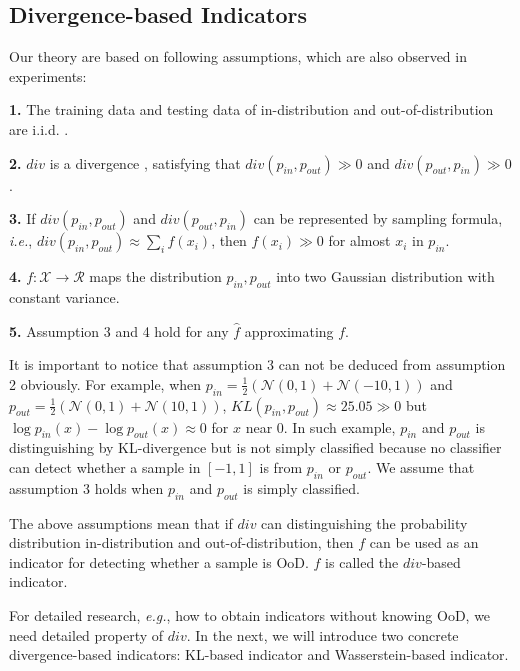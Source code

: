 \documentclass[letterpaper]{article} %
\newcommand{\IE}{\textit{i.e.}, }
\newcommand{\EG}{\textit{e.g.}, }
\newcommand{\pin}{p_{in}}
\newcommand{\pout}{p_{out}}
\begin{document}
\subsection{Divergence-based Indicators}
Our theory are based on following assumptions, which are also observed in experiments:

\noindent \textbf{1.} The training data and testing data of in-distribution and out-of-distribution are i.i.d. .

\noindent \textbf{2.}  $div$ is a divergence , satisfying that $div(\pin, \pout) \gg 0$ and $div(\pout, \pin) \gg 0$. 

\noindent \textbf{3.}  If $div(\pin, \pout)$ and $div(\pout, \pin)$ can be represented by sampling formula, \IE $div(\pin, \pout) \approx \sum_{i} f(x_i)$, then $f(x_i) \gg 0$ for almost $x_i$ in $\pin$. 

\noindent \textbf{4.} $f: \mathcal{X} \rightarrow \mathcal{R}$ maps the distribution $\pin, \pout$ into two Gaussian distribution with constant variance. 

\noindent \textbf{5.} Assumption 3 and 4 hold for any $\hat{f}$ approximating $f$. 


It is important to notice that assumption 3 can not be deduced from assumption 2 obviously. For example, when $\pin = \frac{1}{2}(\mathcal{N}(0, 1) + \mathcal{N}(-10, 1))$ and $\pout = \frac{1}{2}(\mathcal{N}(0, 1) + \mathcal{N}(10, 1))$, $KL(\pin, \pout) \approx 25.05 \gg 0$ but $\log \pin(x) - \log \pout(x) \approx 0$ for $x$ near 0.  In such example, $\pin$ and $\pout$ is distinguishing by KL-divergence but is not simply classified because no classifier can detect whether a sample in $[-1, 1]$ is from $\pin$ or $\pout$. We assume that assumption 3 holds when $\pin$ and $\pout$ is simply classified. 

The above assumptions mean that if $div$ can distinguishing the probability distribution                                                                                                        in-distribution and out-of-distribution, then $f$ can be used as an indicator for detecting whether a sample is OoD. $f$ is called the $div$-based indicator. 

For detailed research, \EG how to obtain indicators without knowing OoD, we need detailed property of $div$. 
In the next, we will introduce two concrete divergence-based indicators: KL-based indicator and Wasserstein-based indicator. 
\end{document}
